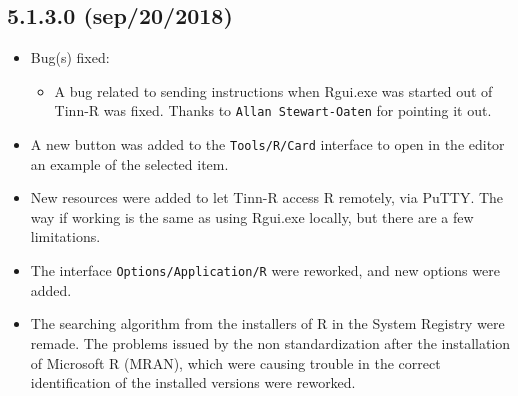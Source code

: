 \subsection*{5.1.3.0 (sep/20/2018)}
\begin{itemize}
  \item Bug(s) fixed:
    \begin{itemize}
      \item A bug related to sending instructions when Rgui.exe was started out of Tinn-R was fixed.
      Thanks to \texttt{Allan Stewart-Oaten} for pointing it out.
    \end{itemize}
  \item A new button was added to the \texttt{Tools/R/Card} interface to open in the editor an example
  of the selected item.
  \item New resources were added to let Tinn-R access R remotely, via PuTTY.
    The way if working is the same as using Rgui.exe locally, but there are a few limitations.
  \item The interface \texttt{Options/Application/R} were reworked, and new options were added.
  \item The searching algorithm from the installers of R in the System Registry were remade. The problems issued
    by the non standardization after the installation of Microsoft R (MRAN), which were causing trouble in
    the correct identification of the installed versions were reworked.
\end{itemize}